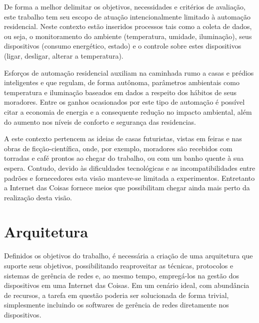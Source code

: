 \documentclass[twoside,english,brazilian]{UNISINOSmonografia}
\begin{document}
De forma a melhor delimitar os objetivos, necessidades e critérios de 
avaliação, este trabalho tem seu escopo de atuação intencionalmente limitado 
à automação residencial.
Neste contexto estão inseridos processos tais como a coleta de dados, ou seja, 
o monitoramento do ambiente (temperatura, umidade, iluminação), 
seus dispositivos (consumo energético, estado) e 
o controle sobre estes dispositivos (ligar, desligar, alterar a temperatura).


Esforços de automação residencial auxiliam na caminhada rumo a casas e prédios 
inteligentes e que regulam, de forma autônoma, parâmetros ambientais como 
temperatura e iluminação baseados em dados a respeito dos hábitos de seus 
moradores.
Entre os ganhos ocasionados por este tipo de automação é possível citar a 
economia de energia e a consequente redução no impacto ambiental, além do 
aumento nos níveis de conforto e segurança das residencias.


A este contexto pertencem as ideias de casas futuristas, vistas em feiras e 
nas obras de ficção-científica, onde, por exemplo, moradores são recebidos com 
torradas e café prontos ao chegar do trabalho, ou com um banho quente à sua 
espera.
Contudo, devido às dificuldades tecnológicas e as incompatibilidades entre 
padrões e fornecedores esta visão manteve-se limitada a experimentos.
Entretanto a Internet das Coisas fornece meios que possibilitam chegar ainda 
mais perto da realização desta visão.


\section{Arquitetura}

Definidos os objetivos do trabalho, é necessária a criação de uma arquitetura 
que suporte seus objetivos, possibilitando reaproveitar as técnicas, 
protocolos e sistemas de gerência de redes e, ao mesmo tempo, empregá-los na 
gestão dos dispositivos em uma Internet das Coisas.
Em um cenário ideal, com abundância de recursos, a tarefa em questão poderia 
ser solucionada de forma trivial, simplesmente incluindo os softwares de 
gerência de redes diretamente nos dispositivos.
\end{document}
